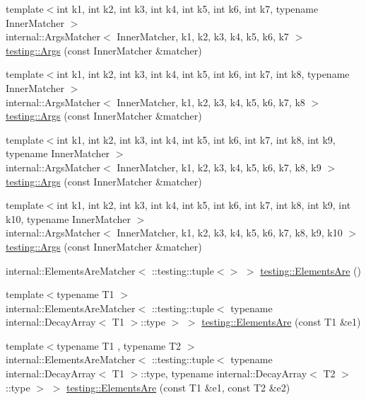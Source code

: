 \begin{DoxyCompactItemize}
\item 
{\footnotesize template$<$int k1, int k2, int k3, int k4, int k5, int k6, int k7, typename Inner\+Matcher $>$ }\\internal\+::\+Args\+Matcher$<$ Inner\+Matcher, k1, k2, k3, k4, k5, k6, k7 $>$ \mbox{\hyperlink{namespacetesting_a9a9ef7a866b397430527076e342817f9}{testing\+::\+Args}} (const Inner\+Matcher \&matcher)
\item 
{\footnotesize template$<$int k1, int k2, int k3, int k4, int k5, int k6, int k7, int k8, typename Inner\+Matcher $>$ }\\internal\+::\+Args\+Matcher$<$ Inner\+Matcher, k1, k2, k3, k4, k5, k6, k7, k8 $>$ \mbox{\hyperlink{namespacetesting_ae8a4e8e1b8eb87c9f1e5f02519da7fce}{testing\+::\+Args}} (const Inner\+Matcher \&matcher)
\item 
{\footnotesize template$<$int k1, int k2, int k3, int k4, int k5, int k6, int k7, int k8, int k9, typename Inner\+Matcher $>$ }\\internal\+::\+Args\+Matcher$<$ Inner\+Matcher, k1, k2, k3, k4, k5, k6, k7, k8, k9 $>$ \mbox{\hyperlink{namespacetesting_a62c877e01fb9098cd3c399f921bf4e3e}{testing\+::\+Args}} (const Inner\+Matcher \&matcher)
\item 
{\footnotesize template$<$int k1, int k2, int k3, int k4, int k5, int k6, int k7, int k8, int k9, int k10, typename Inner\+Matcher $>$ }\\internal\+::\+Args\+Matcher$<$ Inner\+Matcher, k1, k2, k3, k4, k5, k6, k7, k8, k9, k10 $>$ \mbox{\hyperlink{namespacetesting_a09ac462e8d6ed468cbfaa9c767aee0aa}{testing\+::\+Args}} (const Inner\+Matcher \&matcher)
\item 
internal\+::\+Elements\+Are\+Matcher$<$ \+::testing\+::tuple$<$$>$ $>$ \mbox{\hyperlink{namespacetesting_a79cf4ae694bf8231dcf283b325405f27}{testing\+::\+Elements\+Are}} ()
\item 
{\footnotesize template$<$typename T1 $>$ }\\internal\+::\+Elements\+Are\+Matcher$<$ \+::testing\+::tuple$<$ typename internal\+::\+Decay\+Array$<$ T1 $>$\+::type $>$ $>$ \mbox{\hyperlink{namespacetesting_aa35aa6c9638d989e9f4aaa6009f60589}{testing\+::\+Elements\+Are}} (const T1 \&e1)
\item 
{\footnotesize template$<$typename T1 , typename T2 $>$ }\\internal\+::\+Elements\+Are\+Matcher$<$ \+::testing\+::tuple$<$ typename internal\+::\+Decay\+Array$<$ T1 $>$\+::type, typename internal\+::\+Decay\+Array$<$ T2 $>$\+::type $>$ $>$ \mbox{\hyperlink{namespacetesting_a864f77fe7774308d4c54f1f52f9040cf}{testing\+::\+Elements\+Are}} (const T1 \&e1, const T2 \&e2)
$$
\end{DoxyCompactItemize}
